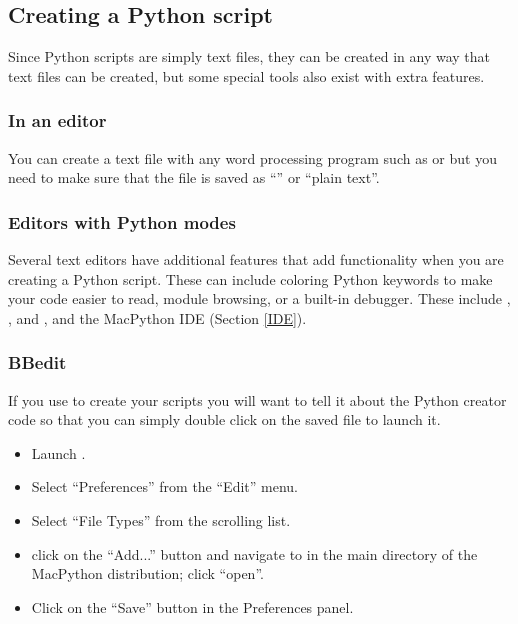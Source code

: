 \subsection{Creating a Python script}

Since Python scripts are simply text files, they can be created in any
way that text files can be created, but some special tools also exist
with extra features.


\subsubsection{In an editor}

You can create a text file with any word processing program such as
 or  but you need to make sure
that the file is saved as ``\ASCII'' or ``plain text''.


\subsubsection{Editors with Python modes}

Several text editors have additional features that add functionality
when you are creating a Python script.  These can include coloring
Python keywords to make your code easier to read, module browsing, or
a built-in debugger. These include , ,
and , and the MacPython IDE (Section \ref{IDE}).

 
\subsubsection{BBedit \label{scripting-with-BBedit}}

If you use  to create your scripts you will want to tell it about the Python creator code so that
you can simply double click on the saved file to launch it.
\begin{itemize}
  \item Launch .
  \item Select ``Preferences'' from the ``Edit'' menu.
  \item Select ``File Types'' from the scrolling list.
  \item click on the ``Add...'' button and navigate to
         in the main directory of the
        MacPython distribution; click ``open''.
  \item Click on the ``Save'' button in the Preferences panel.
\end{itemize}
 
